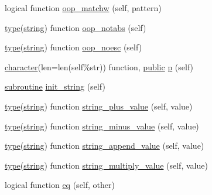 \begin{DoxyCompactItemize}
\item 
logical function \hyperlink{namespacem__strings__oop_ab88f5f814c08f1c93c95fcd0ba2a6779}{oop\+\_\+matchw} (self, pattern)
\item 
\hyperlink{stop__watch_83_8txt_a70f0ead91c32e25323c03265aa302c1c}{type}(\hyperlink{structm__strings__oop_1_1string}{string}) function \hyperlink{namespacem__strings__oop_a5959b2f967a6466c198b39a089ef8a68}{oop\+\_\+notabs} (self)
\item 
\hyperlink{stop__watch_83_8txt_a70f0ead91c32e25323c03265aa302c1c}{type}(\hyperlink{structm__strings__oop_1_1string}{string}) function \hyperlink{namespacem__strings__oop_ae1ed148f1ae0694ac093d3e11f9b702b}{oop\+\_\+noesc} (self)
\item 
\hyperlink{option__stopwatch_83_8txt_abd4b21fbbd175834027b5224bfe97e66}{character}(len=len(self\%str)) function, \hyperlink{M__stopwatch_83_8txt_a2f74811300c361e53b430611a7d1769f}{public} \hyperlink{namespacem__strings__oop_a456e651940e317c7bc885d95458c7fcb}{p} (self)
\item 
\hyperlink{M__stopwatch_83_8txt_acfbcff50169d691ff02d4a123ed70482}{subroutine} \hyperlink{namespacem__strings__oop_a1510c1de10cb182598ce6a399a734be0}{init\+\_\+string} (self)
\item 
\hyperlink{stop__watch_83_8txt_a70f0ead91c32e25323c03265aa302c1c}{type}(\hyperlink{structm__strings__oop_1_1string}{string}) function \hyperlink{namespacem__strings__oop_abf27744e539317dac81d6ed1fb736059}{string\+\_\+plus\+\_\+value} (self, value)
\item 
\hyperlink{stop__watch_83_8txt_a70f0ead91c32e25323c03265aa302c1c}{type}(\hyperlink{structm__strings__oop_1_1string}{string}) function \hyperlink{namespacem__strings__oop_a0ec84db43ac789bfc02f46f933a3fc9f}{string\+\_\+minus\+\_\+value} (self, value)
\item 
\hyperlink{stop__watch_83_8txt_a70f0ead91c32e25323c03265aa302c1c}{type}(\hyperlink{structm__strings__oop_1_1string}{string}) function \hyperlink{namespacem__strings__oop_a64192a93804fcb61ca59725245ee85c2}{string\+\_\+append\+\_\+value} (self, value)
\item 
\hyperlink{stop__watch_83_8txt_a70f0ead91c32e25323c03265aa302c1c}{type}(\hyperlink{structm__strings__oop_1_1string}{string}) function \hyperlink{namespacem__strings__oop_a9624f1e09be383f993e7c0e94b230deb}{string\+\_\+multiply\+\_\+value} (self, value)
\item 
logical function \hyperlink{namespacem__strings__oop_a2e5c8d9117609e553db07a1eba18b1fa}{eq} (self, other)
\item 

\end{DoxyCompactItemize}
